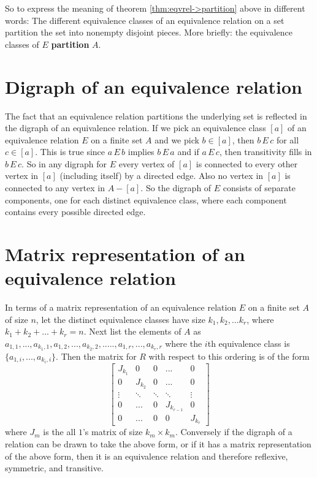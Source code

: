 So to express the meaning of theorem \ref{thm:eqvrel->partition} above in different words: The different equivalence 
classes of an equivalence relation on a set partition the set into nonempty disjoint
pieces. More briefly: the equivalence classes of $E$ {\bfseries partition} $A$.

\section{Digraph of an equivalence relation}
The fact that an equivalence relation partitions the underlying set
is reflected in the digraph of an equivalence relation.
If we pick an equivalence class $[a]$ of an equivalence relation
$E$ on a finite set $A$ and we pick $b\in [a]$, then $b\,E\,c$ for all $c\in [a]$. This is true
since $a\,E\,b$ implies $b\,E\,a$ and if $a\,E\,c$, then transitivity fills in $b\,E\,c$. So in any digraph
for $E$ every vertex of $[a]$ is connected to every other vertex in $[a]$ (including itself)
by a directed edge. Also no vertex in $[a]$ is connected to any  vertex in $A-[a]$. 
So the digraph
of $E$ consists of separate components, one for each distinct equivalence
class, where each component contains every possible directed edge.
\section{Matrix representation of an equivalence relation}
In terms of a matrix representation of an equivalence relation $E$ on a finite set $A$ 
of size $n$,
let the distinct equivalence classes have size $k_1, k_2,... k_r$, 
where $k_1+k_2+...+k_r = n$.
Next list the elements of $A$ as 
$a_{1,1},...,a_{k_1,1},a_{1,2},...,a_{k_2,2},.....,a_{1,r},...,a_{k_r,r}$
where the $i$th equivalence class is $\{a_{1,i},...,a_{k_i,i}\}$. 
Then the matrix for $R$ with respect to this
ordering is of the form 
\[
 \left[
  \begin{matrix}
   J_{k_1}&  0 & 0 & ... & 0 \\
   0 & J_{k_2} & 0 & ... & 0 \\ 
   \vdots & \ddots &\ddots & \ddots & \vdots \\
   0 & ... & 0 & J_{k_{r-1}} & 0 \\
   0 & ... & 0 & 0 & J_{k_r}
  \end{matrix}
 \right]
\]
where $J_m$ is the all $1$'s matrix of size $k_m\times k_m$.
Conversely if the digraph of a relation can be drawn to take the above form, 
or if it has a matrix representation
of the above form, then it is an equivalence relation and therefore reflexive, 
symmetric, and transitive.


